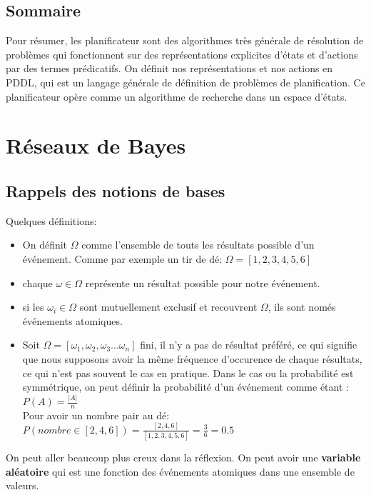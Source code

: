 \documentclass[oneside]{book}
\begin{document}
\subsection{Sommaire}
Pour résumer, les planificateur sont des algorithmes très générale de résolution de problèmes qui fonctionnent sur des représentations explicites d'états et d'actions par des termes prédicatifs. On définit nos représentations et nos actions en PDDL, qui est un langage générale de définition de problèmes de planification. Ce planificateur opère comme un algorithme de recherche dans un espace d'états.

\newpage
\section{Réseaux de Bayes}
\subsection{Rappels des notions de bases}
Quelques définitions:\\
\begin{itemize}
\item On définit $\Omega$ comme l'ensemble de touts les résultats possible d'un événement. Comme par exemple un tir de dé: $\Omega = [1,2,3,4,5,6]$
\item chaque $\omega \in \Omega$ représente un résultat possible pour notre événement.
\item si les $\omega_i \in \Omega$ sont mutuellement exclusif et recouvrent $\Omega$, ils sont només événements atomiques.
\item Soit $\Omega = [\omega_1, \omega_2, \omega_3...\omega_n]$ fini, il n'y a pas de résultat préféré, ce qui signifie que nous supposons avoir la même fréquence d'occurence de chaque résultats, ce qui n'est pas souvent le cas en pratique. Dans le cas ou la probabilité est symmétrique, on peut définir la probabilité d'un événement comme étant :\\

\centering
$P(A) = \frac{|A|}{n}$\\
Pour avoir un nombre pair au dé:\\

$P(nombre \in [2,4,6]) = \frac{[2,4,6]}{[1,2,3,4,5,6]} = \frac{3}{6} = 0.5$
\justify
\end{itemize}

On peut aller beaucoup plus creux dans la réflexion. On peut avoir une \textbf{variable aléatoire} qui est une fonction des événements atomiques dans une ensemble de valeurs. \\
\end{document}
